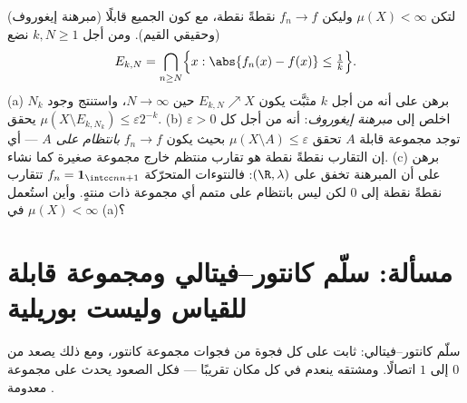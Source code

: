 \begin{exercise}[$\star\star\star$]\label{exo:b3:measure:12}
(مبرهنة إيغوروف) لتكن $\mu(X) < \infty$ وليكن $f_n \to f$ نقطةً نقطة، مع
كون الجميع قابلًا  (وحقيقي القيم). ومن أجل $k, N \geq 1$
نضع
\[
E_{k,N} = \bigcap_{n \geq N}\Bigl\{x : \abs{f_n(x) - f(x)}
\leq \tfrac1k\Bigr\} .
\]
(a) برهن على أنه من أجل $k$ مثبَّت يكون $E_{k,N} \nearrow X$ حين $N \to
\infty$،
واستنتج وجود $N_k$ يحقق $\mu(X \setminus E_{k,N_k})
\leq \varepsilon2^{-k}$.
(b) اخلص إلى \emph{مبرهنة إيغوروف}: أنه من أجل كل $\varepsilon
> 0$ توجد
مجموعة قابلة  $A$ تحقق $\mu(X\setminus A) \leq
\varepsilon$ بحيث يكون $f_n \to f$
\emph{بانتظام على $A$} --- أي إن التقارب نقطةً نقطة هو تقارب
منتظم خارج مجموعة صغيرة كما نشاء.
(c) برهن على أن المبرهنة تخفق على $(\R, \lambda)$: فالنتوءات
المتحرّكة $f_n = \mathbf 1_{\intcc n{n+1}}$ تتقارب نقطةً نقطة إلى $0$ لكن ليس بانتظام على
متمم أي مجموعة ذات  منتهٍ. وأين استُعمل $\mu(X) < \infty$ في (a)؟
\end{exercise}

\section{مسألة: سلّم كانتور--فيتالي ومجموعة قابلة للقياس وليست
بوريلية}

\begin{omfigure}

{\small سلّم كانتور--فيتالي: ثابت على كل فجوة من فجوات مجموعة
كانتور، ومع ذلك يصعد من $0$ إلى $1$ اتصالًا. ومشتقه ينعدم في
كل مكان تقريبًا --- فكل الصعود يحدث على مجموعة معدومة .}
\end{omfigure}

